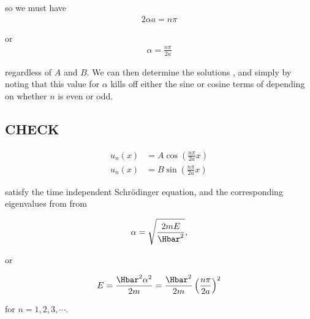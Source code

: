 so we must have
\begin{equation}\label{eqn:lecture9boundStates:180}
\begin{aligned}
2 \alpha a = n \pi
\end{aligned}
\end{equation}

or
\begin{equation}\label{eqn:lecture9boundStates:200}
\begin{aligned}
\alpha = \frac{n \pi}{2a}
\end{aligned}
\end{equation}

regardless of $A$ and $B$.  We can then determine the solutions , and  simply by noting that this value for $\alpha$ kills off either the sine or cosine terms of  depending on whether $n$ is even or odd.

\subsection{CHECK}

\begin{equation}\label{eqn:lecture9boundStates:220}
\begin{aligned}
u_n(x) &= A \cos \left( \frac{n \pi}{2 a} x \right) \\
u_n(x) &= B \sin \left( \frac{n \pi}{2 a} x \right)
\end{aligned}
\end{equation}

satisfy the time independent Schr\"{o}dinger equation, and the corresponding eigenvalues from from

\begin{equation}\label{eqn:lecture9boundStates:240}
\begin{aligned}
\alpha = \sqrt{\frac{2 m E}{\Hbar^2}},
\end{aligned}
\end{equation}

or

\begin{equation}\label{eqn:lecture9boundStates:260}
\begin{aligned}
E = \frac{\Hbar^2 \alpha^2}{2m} = \frac{\Hbar^2}{2m} \left( \frac{n \pi}{2a} \right)^2
\end{aligned}
\end{equation}

for $n = 1, 2, 3, \cdots$.

